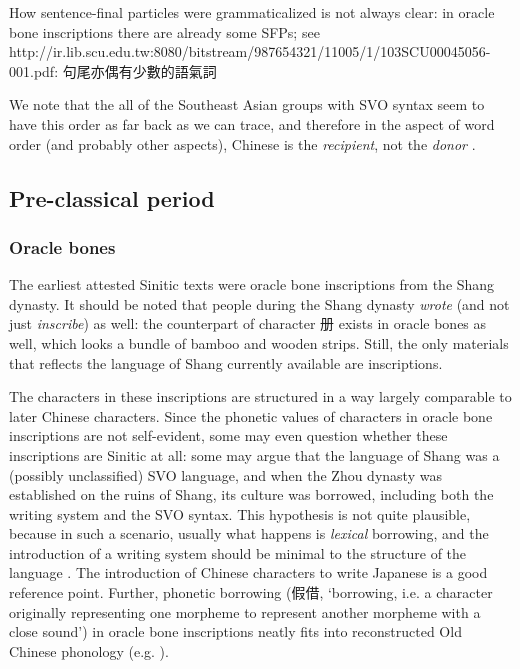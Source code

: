 \documentclass[UTF8, a4paper, oneside, scheme=plain, 12pt]{ctexrep}
\newcommand*{\citepage}[1]{p.~{#1}}
\newcommand*{\citepages}[1]{pp.~{#1}}
\newcommand{\translate}[1]{`#1'}
\begin{document}
How sentence-final particles were grammaticalized is not always clear:
in oracle bone inscriptions there are already some SFPs;
see http://ir.lib.scu.edu.tw:8080/bitstream/987654321/11005/1/103SCU00045056-001.pdf:
句尾亦偶有少數的語氣詞

We note that the all of the Southeast Asian groups with SVO syntax seem to
have this order as far back as we can trace,
and therefore in the aspect of word order (and probably other aspects),
Chinese is the \emph{recipient}, not the \emph{donor} \citep[\citepage{82-85}]{delancey2013origins}.

\subsection{Pre-classical period}\label{sec:intro-pre-classical}

\subsubsection{Oracle bones}\label{sec:intro.pre-classical.shang}

The earliest attested Sinitic texts were oracle bone inscriptions from the Shang dynasty.
It should be noted that people during the Shang dynasty \emph{wrote} (and not just \emph{inscribe}) as well:
the counterpart of character 册 exists in oracle bones as well,
which looks a bundle of bamboo and wooden strips.
Still, the only materials that reflects the language of Shang currently available are inscriptions.

The characters in these inscriptions are structured in a way largely comparable to later Chinese characters.
Since the phonetic values of characters in oracle bone inscriptions are not self-evident,
some may even question whether these inscriptions are Sinitic at all:
some may argue that the language of Shang was a (possibly unclassified) SVO language,
and when the Zhou dynasty was established on the ruins of Shang,
its culture was borrowed, including both the writing system and the SVO syntax.
This hypothesis is not quite plausible, because in such a scenario, usually what happens is \emph{lexical} borrowing,
and the introduction of a writing system should be minimal to the structure of the language
\citep[\citepage{88}]{delancey2013origins}.
The introduction of Chinese characters to write Japanese is a good reference point.
Further, phonetic borrowing (假借, \translate{borrowing, i.e. a character originally representing one morpheme to represent another morpheme with a close sound}) in oracle bone inscriptions
neatly fits into reconstructed Old Chinese phonology
(e.g. \citealt[\citepages{115}]{baxter2014old}).
\end{document}
